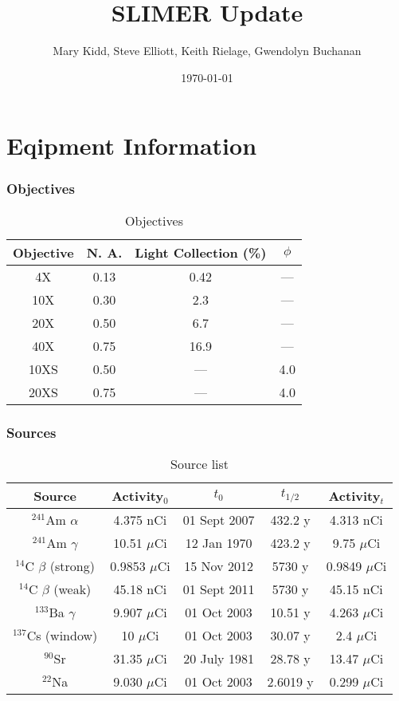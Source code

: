 \documentclass[a4paper,10pt]{article}
\title{SLIMER Update}
\author{Mary Kidd, Steve Elliott, Keith Rielage, Gwendolyn Buchanan}
\date{\today} %
\begin{document}
\maketitle
\tableofcontents

\part{Eqipment Information}
\section{Objectives}

\begin{table}[!htbp]
	\centering
	\caption{Objectives}
	\vspace{.5cm}
	\label{tab:table2}
	\begin{tabular}{cccc}
		\toprule
		Objective & N. A. & Light Collection (\%) & $\phi$\\
		\midrule
		4X & 0.13 & 0.42 & ---\\
		10X & 0.30 & 2.3 & ---\\
		20X & 0.50 & 6.7 & ---\\
		40X & 0.75 & 16.9 & ---\\
		10XS & 0.50 & --- & 4.0\\
		20XS & 0.75 & --- & 4.0\\
		\bottomrule
	\end{tabular}
\end{table}

\section{Sources}

\begin{table}[!htbp]
	\centering
	\caption{Source list}
	\vspace{.5cm}
	\label{tab:table1}
	\begin{tabular}{ccccc}
		\toprule
		Source & Activity$_0$ & $t_0$ & $t_{1/2}$ & Activity$_t$\\
		\midrule
		$^{241}$Am $\alpha$ & 4.375 nCi & 01 Sept 2007 & 432.2 y & 4.313 nCi\\
		$^{241}$Am $\gamma$ & 10.51 $\mu$Ci & 12 Jan 1970 & 423.2 y & 9.75 $\mu$Ci\\
		$^{14}$C $\beta$ (strong) & 0.9853 $\mu$Ci & 15 Nov 2012 & 5730 y & 0.9849 $\mu$Ci\\
		$^{14}$C $\beta$ (weak) & 45.18 nCi & 01 Sept 2011 & 5730 y & 45.15 nCi\\
		$^{133}$Ba $\gamma$ & 9.907 $\mu$Ci & 01 Oct 2003 & 10.51 y & 4.263 $\mu$Ci\\
		$^{137}$Cs (window) & 10 $\mu$Ci & 01 Oct 2003 & 30.07 y & 2.4 $\mu$Ci\\
		$^{90}$Sr & 31.35 $\mu$Ci & 20 July 1981 & 28.78 y & 13.47 $\mu$Ci\\ 
		$^{22}$Na & 9.030 $\mu$Ci & 01 Oct 2003 & 2.6019 y & 0.299 $\mu$Ci\\
		\bottomrule
	\end{tabular}
\end{table}
\end{document}

